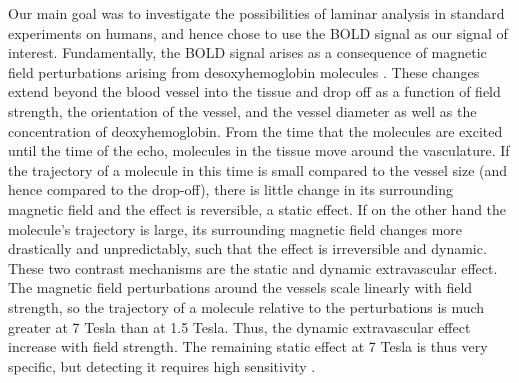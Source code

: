 Our main goal was to investigate the possibilities of laminar analysis in standard experiments on humans, and hence chose to use the BOLD signal as our signal of interest. 
Fundamentally, the BOLD signal arises as a consequence of magnetic field perturbations arising from desoxyhemoglobin molecules \cite{Norris2006}. These changes extend beyond the blood vessel into the tissue and drop off as a function of field strength, the orientation of the vessel, and the vessel diameter as well as the concentration of deoxyhemoglobin. From the time that the molecules are excited until the time of the echo, molecules in the tissue move around the vasculature. If the trajectory of a molecule in this time is small compared to the vessel size (and hence compared to the drop-off), there is little change in its surrounding magnetic field and the effect is reversible, a static effect. If on the other hand the molecule's trajectory is large, its surrounding magnetic field changes more drastically and unpredictably, such that the effect is irreversible and dynamic. These two contrast mechanisms are the static and dynamic extravascular effect. The magnetic field perturbations around the vessels scale linearly with field strength, so the trajectory of a molecule relative to the perturbations is much greater at 7 Tesla than at 1.5 Tesla. Thus, the dynamic extravascular effect increase with field strength. The remaining static effect at 7 Tesla is thus very specific, but detecting it requires high sensitivity \cite{Panchuelo2014}. %

